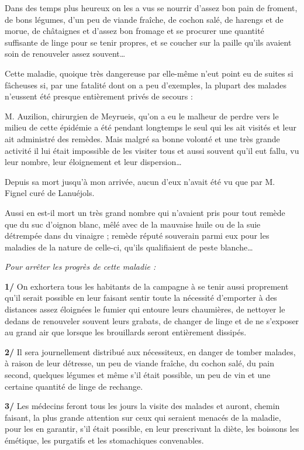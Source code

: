 {\fontsize{10.2}{12.0}\selectfont

Dans des temps plus heureux on les a vus se nourrir d’assez bon pain de froment, de bons légumes, d’un peu de viande fraîche, de cochon salé, de harengs et de morue, de châtaignes et d’assez bon fromage et se procurer une quantité suffisante de linge pour se tenir propres, et se coucher sur la paille qu’ils avaient soin de renouveler assez souvent…

Cette maladie, quoique très dangereuse par elle-même n’eut point eu de suites si fâcheuses si, par une fatalité dont on a peu d’exemples, la plupart des malades n’eussent été presque entièrement privés de secours :

M. Auzilion, chirurgien de Meyrueis, qu’on a eu le malheur de perdre vers le milieu de cette épidémie a été pendant longtemps le seul qui les ait visités et leur ait administré des remèdes. Mais malgré sa bonne volonté et une très grande activité il lui était impossible de les visiter tous et aussi souvent qu’il eut fallu, vu leur nombre, leur éloignement et leur dispersion…

Depuis sa mort jusqu’à mon arrivée, aucun d’eux n’avait été vu que par M. Fignel curé de Lanuéjols.

Aussi en est-il mort un très grand nombre qui n’avaient pris pour tout remède que du suc d’oignon blanc, mêlé avec de la mauvaise huile ou de la suie détrempée dans du vinaigre ; remède réputé souverain parmi eux pour les maladies de la nature de celle-ci, qu’ils qualifiaient de peste blanche…

\textit{Pour arrêter les progrès de cette maladie :}

\quad \textbf{1/} On exhortera tous les habitants de la campagne à se tenir aussi proprement qu’il serait possible en leur faisant sentir toute la nécessité d’emporter à des distances assez éloignées le fumier qui entoure leurs chaumières, de nettoyer le dedans de renouveler souvent leurs grabats, de changer de linge et de ne s’exposer au grand air que lorsque les brouillards seront entièrement dissipés.

\quad \textbf{2/} Il sera journellement distribué aux nécessiteux, en danger de tomber malades, à raison de leur détresse, un peu de viande fraîche, du cochon salé, du pain second, quelques légumes et même s’il était possible, un peu de vin et une certaine quantité de linge de rechange.

\quad \textbf{3/} Les médecins feront tous les jours la visite des malades et auront, chemin faisant, la plus grande attention sur ceux qui seraient menacés de la maladie, pour les en garantir, s’il était possible, en leur prescrivant la diète, les boissons les émétique, les purgatifs et les stomachiques convenables.

}

